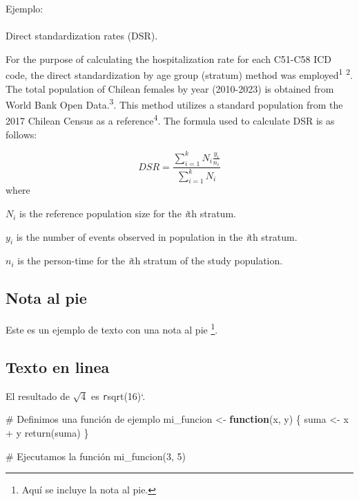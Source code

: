 \documentclass[
  10pt,
]{article}
\makeatletter
\let\oldparagraph\paragraph
\renewcommand{\paragraph}{
    \@ifstar
      \xxxParagraphStar
      \xxxParagraphNoStar
  }
\newcommand{\xxxParagraphStar}[1]{\oldparagraph*{#1}\mbox{}}
\newcommand{\xxxParagraphNoStar}[1]{\oldparagraph{#1}\mbox{}}
\newenvironment{Shaded}{\begin{snugshade}}{\end{snugshade}}
\newcommand{\CommentTok}[1]{\textcolor[rgb]{0.37,0.37,0.37}{#1}}
\newcommand{\ControlFlowTok}[1]{\textcolor[rgb]{0.00,0.23,0.31}{\textbf{#1}}}
\newcommand{\DecValTok}[1]{\textcolor[rgb]{0.68,0.00,0.00}{#1}}
\newcommand{\FunctionTok}[1]{\textcolor[rgb]{0.28,0.35,0.67}{#1}}
\newcommand{\NormalTok}[1]{\textcolor[rgb]{0.00,0.23,0.31}{#1}}
\newcommand{\OtherTok}[1]{\textcolor[rgb]{0.00,0.23,0.31}{#1}}
\newcommand{\SpecialCharTok}[1]{\textcolor[rgb]{0.37,0.37,0.37}{#1}}
\makeatother
\begin{document}
Ejemplo:

\paragraph{Direct standardization rates
(DSR).}\label{direct-standardization-rates-dsr.}

For the purpose of calculating the hospitalization rate for each C51-C58
ICD code, the direct standardization by age group (stratum) method was
employed\textsuperscript{1} \textsuperscript{2}. The total population of
Chilean females by year (2010-2023) is obtained from World Bank Open
Data.\textsuperscript{3}. This method utilizes a standard population
from the 2017 Chilean Census as a reference\textsuperscript{4}. The
formula used to calculate DSR is as follows:

\[
DSR = \frac{\sum^k_{i=1}N_i\frac{y_i}{n_i}}{\sum^k_{i=1}N_i}
\] where

\(N_i\) is the reference population size for the \emph{i}th stratum.

\(y_i\) is the number of events observed in population in the \emph{i}th
stratum.

\(n_i\) is the person-time for the \emph{i}th stratum of the study
population.

\subsection{Nota al pie}\label{nota-al-pie}

Este es un ejemplo de texto con una nota al pie \footnote{Aquí se
  incluye la nota al pie.}.

\subsection{Texto en linea}\label{texto-en-linea}

El resultado de \(\sqrt{4}\) es \texttt{r}sqrt(16)`.

\begin{Shaded}
\begin{Highlighting}[]
\CommentTok{\# Definimos una función de ejemplo}
\NormalTok{mi\_funcion }\OtherTok{\textless{}{-}} \ControlFlowTok{function}\NormalTok{(x, y) \{}
\NormalTok{  suma }\OtherTok{\textless{}{-}}\NormalTok{ x }\SpecialCharTok{+}\NormalTok{ y}
  \FunctionTok{return}\NormalTok{(suma)}
\NormalTok{\}}

\CommentTok{\# Ejecutamos la función}
\FunctionTok{mi\_funcion}\NormalTok{(}\DecValTok{3}\NormalTok{, }\DecValTok{5}\NormalTok{)}
\end{Highlighting}
\end{Shaded}
\end{document}
